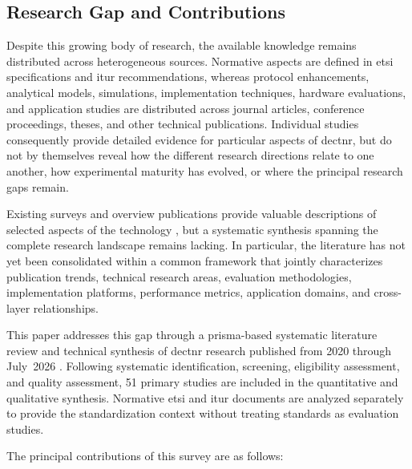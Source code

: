 \subsection{Research Gap and Contributions}
\label{subsec:intro_gap}

Despite this growing body of research, the available knowledge remains
distributed across heterogeneous sources. Normative aspects are defined in
\gls{etsi} specifications and \gls{itur} recommendations, whereas protocol
enhancements, analytical models, simulations, implementation techniques,
hardware evaluations, and application studies are distributed across journal
articles, conference proceedings, theses, and other technical publications.
Individual studies consequently provide detailed evidence for particular
aspects of \gls{dectnr}, but do not by themselves reveal how the different
research directions relate to one another, how experimental maturity has
evolved, or where the principal research gaps remain.

Existing surveys and overview publications provide valuable descriptions of
selected aspects of the technology
\cite{kovalchukovDECT2020NewRadio2022,
perez-guiraoDECTNRUnveiling2022,
smidaETSIDECT2020Component2023}, but a systematic synthesis spanning the
complete research landscape remains lacking. In particular, the literature
has not yet been consolidated within a common framework that jointly
characterizes publication trends, technical research areas, evaluation
methodologies, implementation platforms, performance metrics, application
domains, and cross-layer relationships.

This paper addresses this gap through a \gls{prisma}-based systematic
literature review and technical synthesis of \gls{dectnr} research published
from 2020 through July~2026 \cite{pagePRISMA2020}. Following systematic
identification, screening, eligibility assessment, and quality assessment,
51 primary studies are included in the quantitative and qualitative
synthesis. Normative \gls{etsi} and \gls{itur} documents are analyzed
separately to provide the standardization context without treating standards
as evaluation studies.

The principal contributions of this survey are as follows:

